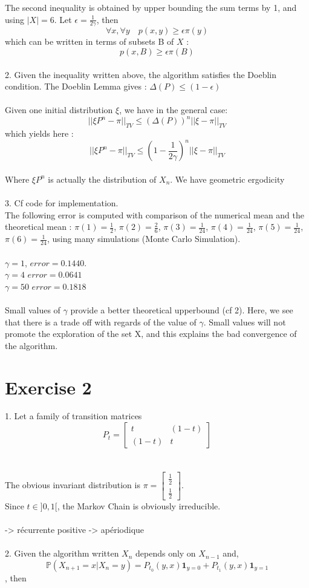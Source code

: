 	The second inequality is obtained by upper bounding the sum terms by 1, and using $|X|=6$.
	Let $\boxed{\epsilon=\frac{1}{2\gamma}}$, then
	$$\forall x, \forall y \quad p(x,y) \geq \epsilon  \pi(y)$$
	which can be written in terms of subsets B of $X$ :
	$$\boxed{p(x,B) \geq \epsilon  \pi(B)}$$
	~\\
	2. Given the inequality written above, the algorithm satisfies the Doeblin condition. The Doeblin Lemma gives : $ \boxed{\Delta(P) \leq ( 1 - \epsilon )}$~\\
	~\\
	Given one initial distribution $\xi$, we have in the general case:
	$$||\xi P^n - \pi||_{TV} \leq (\Delta(P))^{ n } ||\xi-\pi||_{TV}$$
	which yields here :
	$$ \boxed{||\xi P^n - \pi||_{TV} \leq (1-\frac{1}{2\gamma})^{ n } ||\xi-\pi||_{TV}}$$~\\
	Where $\xi P^n$ is actually the distribution of $X_n$. We have geometric ergodicity~\\
	~\\
	3. Cf code for implementation.~\\
	The following error is computed with comparison of the numerical mean and the theoretical mean :  $\pi(1)=\frac{1}{2}$, $\pi(2)=\frac{2}{6}$, $\pi(3)=\frac{1}{24}$, $\pi(4)=\frac{1}{24}$, $\pi(5)=\frac{1}{24}$, $\pi(6)=\frac{1}{24}$, using many simulations (Monte Carlo Simulation).~\\
	~\\
	$\gamma=1$,  $error=0.1440$.~\\
	$\gamma=4$ $error=0.0641$~\\
	$\gamma=50$ $error=0.1818$~\\
	~\\
	Small values of $\gamma$ provide a better theoretical upperbound (cf 2). Here, we see that there is a trade off with regards of the value of $\gamma$. Small values will not promote the exploration of the set X, and this explains the bad convergence of the algorithm.
	\section*{Exercise 2}
	1. Let a family of transition matrices $$ P_t = \begin{bmatrix} t & (1-t) \\ (1-t) & t \end{bmatrix} $$~\\
	~\\
	The obvious invariant distribution is $\pi=\begin{bmatrix} \frac{1}{2} \\ \frac{1}{2} \end{bmatrix}$.
	~\\
	Since $t \in ]0,1[$, the Markov Chain is obviously irreducible. ~\\
	~\\
	-> récurrente positive 
	-> apériodique ~\\
	~\\
	2. Given the algorithm written $X_n$ depends only on $X_{n-1}$ and, $$\mathbb{P}(X_{n+1}=x | X_{n}=y)= P_{t_0}(y,x)\textbf{1}_{y=0}+P_{t_1}(y,x)\textbf{1}_{y=1}$$, then 
	
